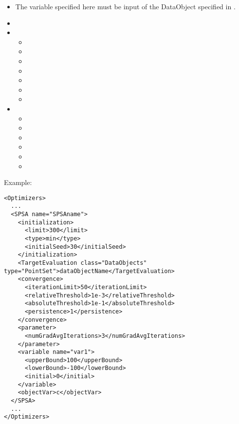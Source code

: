\begin{itemize}
\item \variableDescription
 The variable specified here must be input of the DataObject specified in .
 \variableChildrenIntro
 \begin{itemize}
 \end{itemize}
\item \constantVariablesDescription
\item \convergence
  \begin{itemize}
  \item \iterationLimit
  \item \persistence
  \item \relativeThreshold
  \item \absoluteThreshold
  \item \minStepSize
  \item \gainGrowthFactor
  \item \gainShrinkFactor
  \end{itemize}
\item \parameter
  \begin{itemize}
  \item \numGradAvgIterations
  \item \stochasticDistribution
  \item \initialStepSize
  \item \perturbationDistance
  \item \innerBisectionThreshold
  \item \innerLoopLimit
  \end{itemize}
\end{itemize}


Example:
\begin{lstlisting}[style=XML]
<Optimizers>
  ...
  <SPSA name="SPSAname">
    <initialization>
      <limit>300</limit>
      <type>min</type>
      <initialSeed>30</initialSeed>
    </initialization>
    <TargetEvaluation class="DataObjects" type="PointSet">dataObjectName</TargetEvaluation>
    <convergence>
      <iterationLimit>50</iterationLimit>
      <relativeThreshold>1e-3</relativeThreshold>
      <absoluteThreshold>1e-1</absoluteThreshold>
      <persistence>1</persistence>
    </convergence>
    <parameter>
      <numGradAvgIterations>3</numGradAvgIterations>
    </parameter>
    <variable name="var1">
      <upperBound>100</upperBound>
      <lowerBound>-100</lowerBound>
      <initial>0</initial>
    </variable>
    <objectVar>c</objectVar>
  </SPSA>
  ...
</Optimizers>
\end{lstlisting}


